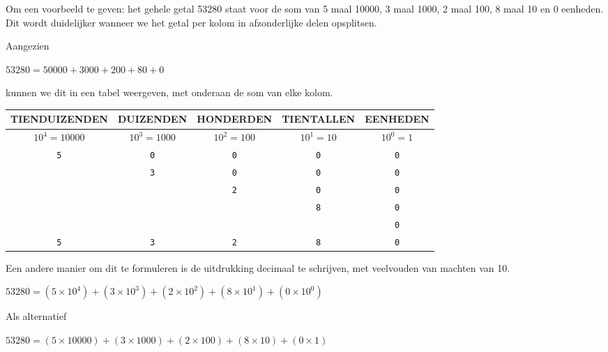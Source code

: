 Om een voorbeeld te geven: het gehele getal 53280 staat voor de som van 5 maal 10000, 3 maal 1000, 2 maal 100, 8 maal 10 en 0 eenheden. Dit wordt duidelijker wanneer we het getal per kolom in afzonderlijke delen opsplitsen.

Aangezien
\begin{center}
  $53280 = 50000 + 3000 + 200 + 80 + 0$
\end{center}
kunnen we dit in een tabel weergeven, met onderaan de som van elke kolom.

\begin{center}
  \begin{tabular}{|c|c|c|c|c|}
  \hline
    \small{\bf TIENDUIZENDEN} & \small{\bf DUIZENDEN} & \small{\bf HONDERDEN} & \small{\bf TIENTALLEN} & \small{\bf EENHEDEN} \\ \hline
	  \small{$10^{4} = 10000$} & \small{$10^{3} = 1000$} & \small{$10^{2} = 100$} & \small{$10^{1} = 10$} & \small{$10^{0} = 1$} \\ \hhline{|=|=|=|=|=|}
	  \large{\texttt{5}} & \large{\texttt{0}} & \large{\texttt{0}} & \large{\texttt{0}} & \large{\texttt{0}} \\ \hline
	            & \large{\texttt{3}} & \large{\texttt{0}} & \large{\texttt{0}} & \large{\texttt{0}} \\ \hline
	            &           & \large{\texttt{2}} & \large{\texttt{0}} & \large{\texttt{0}} \\ \hline
	            &           &           & \large{\texttt{8}} & \large{\texttt{0}} \\ \hline
	            &           &           &           & \large{\texttt{0}} \\ \hhline{|=|=|=|=|=|}
	   \Large{\texttt{5}} & \Large{\texttt{3}}  & \Large{\texttt{2}}  & \Large{\texttt{8}}  & \Large{\texttt{0}} \\ \hline
  \end{tabular}
\end{center}

Een andere manier om dit te formuleren is de uitdrukking decimaal te schrijven, met veelvouden van machten van 10.

\begin{center}
  $53280 = (5 \times 10^{4}) + (3 \times 10^{3}) + (2 \times 10^{2}) + (8 \times 10^{1}) + (0 \times 10^{0})$
\end{center}

Als alternatief

\begin{center}
	$53280 = (5 \times 10000) + (3 \times 1000) + (2 \times 100) + (8 \times 10) + (0 \times 1)$
\end{center}

